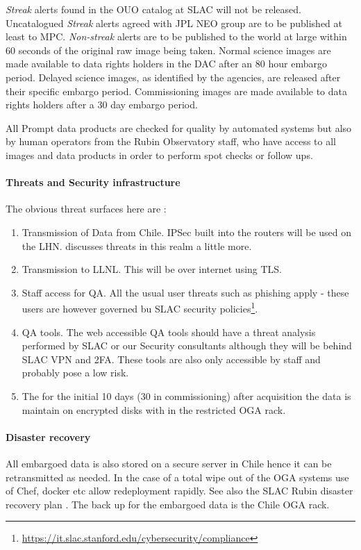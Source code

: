 \emph{Streak} alerts found in the \gls{OUO} catalog at SLAC will not be released.
Uncatalogued \emph{Streak} alerts agreed with \gls{JPL} \gls{NEO} group  are to be published at least to \gls{MPC}.
\emph{Non-streak} alerts are to be published to the world at large within 60 seconds of the original raw image being taken.
Normal science images are made available to data rights holders in the \gls{DAC} after an 80 hour embargo period.
Delayed science images, as identified by the agencies, are released after their specific embargo period. Commissioning images are made available to data rights holders after a 30 day embargo period.

All Prompt data products are checked for quality by automated systems but also by human operators from the Rubin Observatory staff, who have access to all images and data products in order to perform spot checks or follow ups.

\paragraph{ Threats and Security infrastructure}
The obvious threat surfaces here are :
\begin{enumerate}
\item Transmission of Data from Chile. IPSec built into the routers will be used on the \gls{LHN}.  discusses threats in this realm a little more.
\item Transmission to \gls{LLNL}.  This will be over internet using TLS.
\item Staff access for \gls{QA}. All the usual user threats such as phishing apply - these users are however governed bu SLAC security policies\footnote{\url{https://it.slac.stanford.edu/cybersecurity/compliance}}.
\item QA tools. The web accessible QA tools should have a threat analysis performed by SLAC or our Security consultants although they will be behind SLAC \gls{VPN} and 2FA. These tools are also only accessible by staff and probably pose a low risk.
\item The for the initial 10 days (30 in commissioning) after acquisition the data is maintain on encrypted disks with in the restricted \gls{OGA} rack.
\end{enumerate}

\paragraph{Disaster recovery}
All embargoed data is also stored on a secure server in Chile hence it can be retransmitted as needed.
In the case of a total wipe out of the \gls{OGA} systems use of Chef, docker etc allow redeployment rapidly.
See also the \gls{SLAC} Rubin disaster recovery plan .
The back up for the embargoed data is the Chile OGA rack.

